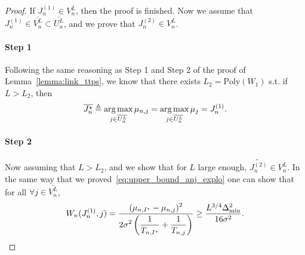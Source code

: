 \begin{proof}
    If $J_n^{(1)} \in V_n^L$, then the proof is finished. Now we assume that $J_n^{(1)} \in \bar{V_n^L} \subset \bar{U_n^L}$, and we prove that $J_n^{(2)} \in V_n^L$.
    \paragraph{Step 1} Following the same reasoning as Step 1 and Step 2 of the proof of Lemma~\ref{lemma:link_ttps}, we know that there exists $L_2 = \text{Poly}(W_1)$ s.t. if $L>L_2$, then
    \[
        \overline{J_n^\star} \triangleq \operatorname*{arg\,max}_{j\in\overline{U_n^L}} \mu_{n,j} = \operatorname*{arg\,max}_{j\in\overline{U_n^L}} \mu_j = J_n^{(1)}.
    \]
    
    \paragraph{Step 2} Now assuming that $L>L_2$, and we show that for $L$ large enough, $\tilde{J_n^{(2)}} \in V_n^L$. In the same way that we proved~\eqref{eq:upper_bound_anj_explo} one can show that for all $\forall j \in \bar{V_n^L}$,
    \[
        W_n(J_n^{(1)},j) = \frac{\displaystyle (\mu_{n,I^\star}-\mu_{n,j})^2}{\displaystyle 2\sigma^2\left(\frac{1}{T_{n,I^\star}}+\frac{1}{T_{n,j}}\right)} \geq \frac{L^{3/4}\Delta_{\text{min}}^2}{16\sigma^2}.
    \]
    

\end{proof}

